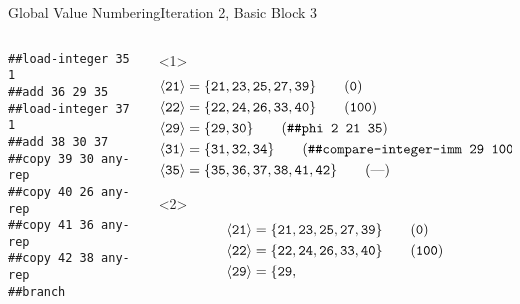 \documentclass{beamer}
\newcommand{\vn}[1]{\ensuremath{\langle\texttt{#1}\rangle}}
\newcommand{\vreg}[1]{\texttt{#1}}
\begin{document}
\begin{frame}[fragile]{Global Value Numbering}{Iteration 2, Basic Block 3}
  \footnotesize
  \begin{columns}[t,onlytextwidth]
    \begin{column}[t]{.5\textwidth}
      \begin{Verbatim}[frame=single]
##load-integer 35 1
##add 36 29 35
##load-integer 37 1
##add 38 30 37
##copy 39 30 any-rep
##copy 40 26 any-rep
##copy 41 36 any-rep
##copy 42 38 any-rep
##branch
      \end{Verbatim}
    \end{column}
    \begin{column}{.5\textwidth}
      \begin{onlyenv}<1>
        \begin{align*}
          \vn{21} &= \{\vreg{21},
                       \vreg{23},
                       \vreg{25},
                       \vreg{27},
                       \vreg{39}\} \tag{\texttt{0}} \\
          \vn{22} &= \{\vreg{22},
                       \vreg{24},
                       \vreg{26},
                       \vreg{33},
                       \vreg{40}\} \tag{\texttt{100}} \\
          \vn{29} &= \{\vreg{29},
                       \vreg{30}\} \tag{\texttt{\#\#phi 2 21 35}} \\
          \vn{31} &= \{\vreg{31},
                       \vreg{32},
                       \vreg{34}\} \tag{\texttt{\#\#compare-integer-imm 29 100 cc<}} \\
          \vn{35} &= \{\vreg{35},
                       \vreg{36},
                       \vreg{37},
                       \vreg{38},
                       \vreg{41},
                       \vreg{42}\} \tag{---}
        \end{align*}
      \end{onlyenv}
      \begin{onlyenv}<2>
        \begin{align*}
          \vn{21} &= \{\vreg{21},
                       \vreg{23},
                       \vreg{25},
                       \vreg{27},
                       \vreg{39}\} \tag{\texttt{0}} \\
          \vn{22} &= \{\vreg{22},
                       \vreg{24},
                       \vreg{26},
                       \vreg{33},
                       \vreg{40}\} \tag{\texttt{100}} \\
          \vn{29} &= \{\vreg{29},

\end{align*}
\end{onlyenv}
\end{column}
\end{columns}
\end{frame}
\end{document}
